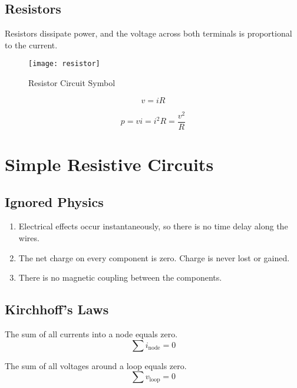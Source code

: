 \documentclass{article}
\begin{document}
\subsection{Resistors}
\begin{definition}[Resistor]
    Resistors dissipate power, and the voltage across both terminals is proportional to the current.
\end{definition}
\begin{figure}[H]
    \centering
    \texttt{[image: resistor]}
    \caption{Resistor Circuit Symbol}
\end{figure}
\begin{theorem}
    \begin{equation*}
        v=iR
    \end{equation*}
\end{theorem}
\begin{corollary}
    \begin{equation*}
	p = vi = i^2 R = \frac{v^2}{R}
    \end{equation*}
\end{corollary}
\newpage
\section{Simple Resistive Circuits}
\subsection{Ignored Physics}
\begin{enumerate}
    \item Electrical effects occur instantaneously, so there is no time delay along the wires.
    \item The net charge on every component is zero. Charge is never lost or gained.
    \item There is no magnetic coupling between the components.
\end{enumerate}
\subsection{Kirchhoff's Laws}
\begin{definition}
    The sum of all currents into a node equals zero.
    \begin{equation*}
        \sum i_{\mathrm{node}} = 0
    \end{equation*}
\end{definition}
\begin{definition}
    The sum of all voltages around a loop equals zero.
    \begin{equation*}
        \sum v_{\mathrm{loop}} = 0
    \end{equation*}
\end{definition}
\end{document}
